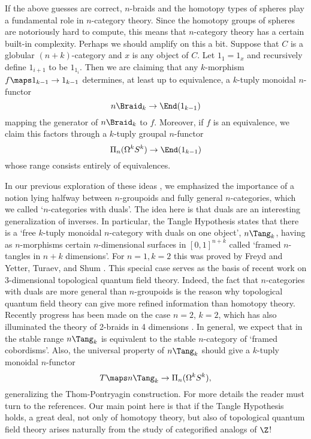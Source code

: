 If the above guesses are correct, $n$-braids and the homotopy types of
spheres play a fundamental role in $n$-category theory.  Since the 
homotopy groups of spheres are notoriously hard to compute, this means
that $n$-category theory has a certain built-in complexity.  Perhaps we
should amplify on this a bit.  Suppose that $C$ is a globular
$(n+k)$-category and $x$ is any object of $C$.  Let $1_1 = 1_x$ and
recursively define $1_{i+1}$ to be $1_{1_i}$.   Then we are claiming
that any $k$-morphism $f \maps 1_{k-1} \to 1_{k-1}$ determines, at least
up to equivalence, a $k$-tuply monoidal $n$-functor
\[           n\Braid_k \to \End(1_{k-1})     \]
mapping the generator of $n\Braid_k$ to $f$.  Moreover, if $f$ is 
an equivalence, we claim this factors through a $k$-tuply groupal
$n$-functor
\[          \Pi_n(\Omega^k S^k) \to \End(1_{k-1})  \]
whose range consists entirely of equivalences.  

In our previous exploration of these ideas \cite{BD}, we emphasized the
importance of a notion lying halfway between $n$-groupoids and fully
general $n$-categories, which we called `$n$-categories with duals'.
The idea here is that duals are an interesting generalization of
inverses.  In particular, the Tangle Hypothesis states that there is a
`free $k$-tuply monoidal $n$-category with duals on one object',
$n\Tang_k$, having as $n$-morphisms certain $n$-dimensional surfaces in
$[0,1]^{n+k}$ called `framed $n$-tangles in $n+k$ dimensions'.  For $n =
1, k = 2$ this was proved by Freyd and Yetter, Turaev, and Shum
\cite{FY,Shum,T,Y}.  This special case serves as the basis of recent
work on 3-dimensional topological quantum field theory.  Indeed, the
fact that $n$-categories with duals are more general than $n$-groupoids
is the reason why topological quantum field theory can give more refined
information than homotopy theory.  Recently progress has been made on
the case $n = 2$, $k = 2$, which has also illuminated the theory of
2-braids in 4 dimensions \cite{BL,BL2,CRS,KT}.  In general, we expect
that in the stable range $n\Tang_k$ is equivalent to the stable
$n$-category of `framed cobordisms'.  Also, the universal property of
$n\Tang_k$ should give a $k$-tuply monoidal $n$-functor
\[ T \maps n\Tang_k \to \Pi_n(\Omega^k S^k), \] 
generalizing the Thom-Pontryagin construction.  For more details the
reader must turn to the references.  Our main point here is that if the
Tangle Hypothesis holds, a great deal, not only of homotopy theory, but
also of topological quantum field theory arises naturally from
the study of categorified analogs of $\Z$!


